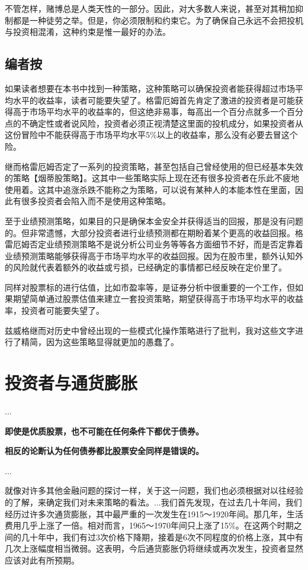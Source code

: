 \documentclass[12pt,oneside]{book}
\begin{document}
不管怎样，赌博总是人类天性的一部分。因此，对大多数人来说，甚至对其稍加抑制都是一种徒劳之举。但是，你必须限制和约束它。为了确保自己永远不会把投机与投资相混淆，这种约束是惟一最好的办法。



\subsection{编者按}
如果读者想要在本书中找到一种策略，这种策略可以确保投资者能获得超过市场平均水平的收益率，读者可能要失望了。格雷厄姆首先肯定了激进的投资者是可能获得高于市场平均水平的收益率的，但这绝非易事，每高出一个百分点就多一个百分点的不确定性或者说风险，投资者必须正视清楚这里面的投机成分，如果投资者从这份冒险中不能获得高于市场平均水平5\%以上的收益率，那么没有必要去冒这个险。

继而格雷厄姆否定了一系列的投资策略，甚至包括自己曾经使用的但已经基本失效的策略【烟蒂股策略】。这其中一些策略实际上现在还有很多投资者在乐此不疲地使用着。这其中追涨杀跌不能称之为策略，可以说有某种人的本能本性在里面，因此有很多投资者会陷入而不是使用这种策略。

至于业绩预测策略，如果目的只是确保本金安全并获得适当的回报，那是没有问题的。但非常遗憾，大部分投资者进行业绩预测都在期盼着某个更高的收益回报。格雷厄姆否定业绩预测策略不是说分析公司业务等等各方面细节不好，而是否定靠着业绩预测策略能够获得高于市场平均水平的收益回报。因为在股市里，额外认知外的风险就代表着额外的收益或亏损，已经确定的事情都已经反映在定价里了。

同样对股票标的进行估值，比如市盈率等，是证券分析中很重要的一个工作，但如果期望简单通过股票估值来建立一套投资策略，期望获得高于市场平均水平的收益率，投资者可能要失望了。

兹威格继而对历史中曾经出现的一些模式化操作策略进行了批判，我对这些文字进行了精简，因为这些策略显得就更加的愚蠢了。


\section{投资者与通货膨胀}
...

\textbf{即使是优质股票，也不可能在任何条件下都优于债券。}

\textbf{相反的论断认为任何债券都比股票安全同样是错误的。}

...

就像对许多其他金融问题的探讨一样，关于这一问题，我们也必须根据对以往经验的了解，来确定我们对未来策略的看法。...我们首先发现，在过去几十年间，我们经历过许多次通货膨胀，其中最严重的一次发生在1915～1920年间。那几年，生活费用几乎上涨了一倍。相对而言，1965～1970年间只上涨了15\%。在这两个时期之间的几十年中，我们有过3次价格下降期，接着是6次不同程度的价格上涨，其中有几次上涨幅度相当微弱。这表明，今后通货膨胀仍将继续或再次发生，投资者显然应该对此有所预期。
\end{document}
